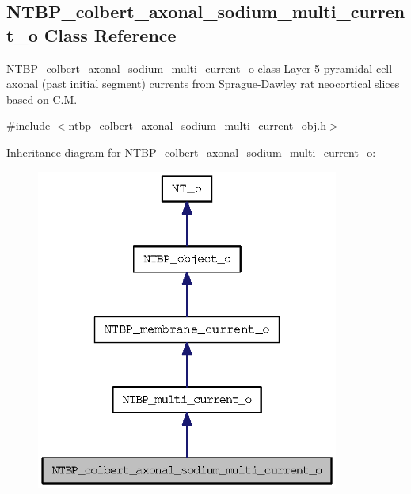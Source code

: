 \subsection{NTBP\_\-colbert\_\-axonal\_\-sodium\_\-multi\_\-current\_\-o Class Reference}
\label{class_n_t_b_p__colbert__axonal__sodium__multi__current__o}


\hyperlink{class_n_t_b_p__colbert__axonal__sodium__multi__current__o}{NTBP\_\-colbert\_\-axonal\_\-sodium\_\-multi\_\-current\_\-o} class Layer 5 pyramidal cell axonal (past initial segment) currents from Sprague-\/Dawley rat neocortical slices based on C.M.  




{\ttfamily \#include $<$ntbp\_\-colbert\_\-axonal\_\-sodium\_\-multi\_\-current\_\-obj.h$>$}



Inheritance diagram for NTBP\_\-colbert\_\-axonal\_\-sodium\_\-multi\_\-current\_\-o:
\nopagebreak
\begin{figure}[H]
\begin{center}
\leavevmode
\includegraphics[width=282pt]{class_n_t_b_p__colbert__axonal__sodium__multi__current__o__inherit__graph}
\end{center}
\end{figure}


